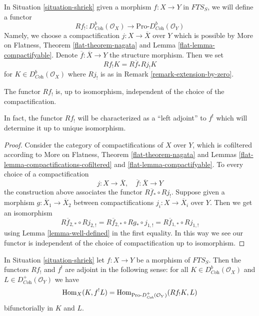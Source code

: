 \noindent
In Situation \ref{situation-shriek} given a morphism $f : X \to Y$
in $\textit{FTS}_S$, we will define a functor
$$
Rf_! : D^b_{\textit{Coh}}(\mathcal{O}_X)
\longrightarrow
\text{Pro-}D^b_{\textit{Coh}}(\mathcal{O}_Y)
$$
Namely, we choose a compactification $j : X \to \overline{X}$ over $Y$
which is possible by More on Flatness, Theorem \ref{flat-theorem-nagata} and
Lemma \ref{flat-lemma-compactifyable}. Denote
$\overline{f} : \overline{X} \to Y$ the structure morphism. Then we set
$$
Rf_!K  = R\overline{f}_* Rj_! K
$$
for $K \in D^b_{\textit{Coh}}(\mathcal{O}_X)$ where $Rj_!$ is
as in Remark \ref{remark-extension-by-zero}.

\begin{lemma}
\label{lemma-lower-shriek-well-defined}
The functor $Rf_!$ is, up to isomorphism, independent
of the choice of the compactification.
\end{lemma}

\noindent
In fact, the functor $Rf_!$ will be characterized as a ``left adjoint''
to $f^!$ which will determine it up to unique isomorphism.

\begin{proof}
Consider the category of compactifications of $X$ over $Y$, which is
cofiltered according to More on Flatness, Theorem \ref{flat-theorem-nagata} and
Lemmas \ref{flat-lemma-compactifications-cofiltered} and
\ref{flat-lemma-compactifyable}.
To every choice of a compactification
$$
j : X \to \overline{X},\quad \overline{f} : \overline{X} \to Y
$$
the construction above associates the functor $R\overline{f}_* \circ Rj_!$.
Suppose given a morphism $g : \overline{X}_1 \to \overline{X}_2$
between compactifications $j_i : X \to \overline{X}_i$ over $Y$.
Then we get an isomorphism
$$
R\overline{f}_{2, *} \circ Rj_{2, !} =
R\overline{f}_{2, *} \circ Rg_* \circ j_{1, !} =
R\overline{f}_{1, *} \circ Rj_{1, !}
$$
using Lemma \ref{lemma-well-defined} in the first equality. In this way
we see our functor is independent of the choice of compactification
up to isomorphism.
\end{proof}

\begin{proposition}
\label{proposition-duality-compactly-supported}
In Situation \ref{situation-shriek} let $f : X \to Y$ be a morphism of
$\textit{FTS}_S$. Then the functors $Rf_!$ and $f^!$ are adjoint in
the following sense: for all $K \in D^b_{\textit{Coh}}(\mathcal{O}_X)$
and $L \in D^+_{\textit{Coh}}(\mathcal{O}_Y)$ we have
$$
\mathop{\mathrm{Hom}}\nolimits_X(K, f^!L) =
\mathop{\mathrm{Hom}}\nolimits_{\text{Pro-}D^+_{\textit{Coh}}(\mathcal{O}_Y)}(Rf_!K, L)
$$
bifunctorially in $K$ and $L$.
\end{proposition}

